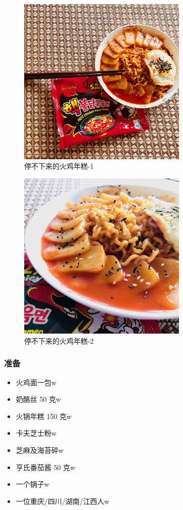 \documentclass[12pt, a4paper]{ctexart}
\begin{document}
\begin{figure}[!t]
    \centering
    \includegraphics[width=3.2in]{figures/hot-chinken-ramen-with-mochi-figure-1}
    \caption{停不下来的火鸡年糕-1}
    \label{hot-chinken-ramen-with-mochi-figure-1}
\end{figure}

\begin{figure}[!t]
    \centering
    \includegraphics[width=3.2in]{figures/hot-chinken-ramen-with-mochi-figure-2}
    \caption{停不下来的火鸡年糕-2}
    \label{hot-chinken-ramen-with-mochi-figure-2}
\end{figure}

\subsubsection{准备}
\begin{itemize}
    \item{火鸡面一包w}
    \item{奶酪丝 50 克w}
    \item{火锅年糕 150 克w}
    \item{卡夫芝士粉w}
    \item{芝麻及海苔碎w}
    \item{亨氏番茄酱 50 克w}
    \item{一个锅子w}
    \item{一位重庆/四川/湖南/江西人w}
\end{itemize}
\end{document}
